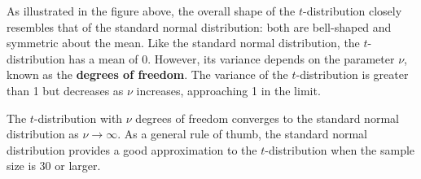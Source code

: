 \documentclass[twoside]{book}
\begin{document}
\begin{center}
\end{center}
As illustrated in the figure above, the overall shape of the \( t \)-distribution closely resembles that of the standard normal distribution: both are bell-shaped and symmetric about the mean. Like the standard normal distribution, the \( t \)-distribution has a mean of 0. However, its variance depends on the parameter \( \nu \), known as the \textbf{degrees of freedom}. The variance of the \( t \)-distribution is greater than 1 but decreases as \( \nu \) increases, approaching 1 in the limit.

\begin{textbox}
The \( t \)-distribution with \( \nu \) degrees of freedom converges to the standard normal distribution as \( \nu \to \infty \). As a general rule of thumb, the standard normal distribution provides a good approximation to the \( t \)-distribution when the sample size is 30 or larger.
\end{textbox}
\end{document}
